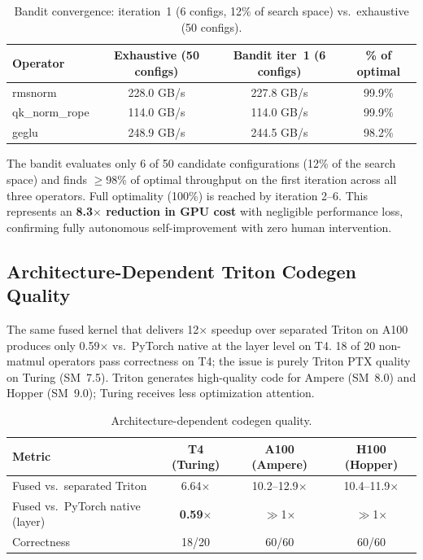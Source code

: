 \documentclass[11pt]{article}
\begin{document}
\begin{table}[t]
\centering
\caption{Bandit convergence: iteration~1 (6 configs, 12\% of search space) vs.\ exhaustive (50 configs).}
\label{tab:bandit-convergence}
\small
\begin{tabular}{@{}lccc@{}}
\toprule
Operator & Exhaustive (50 configs) & Bandit iter~1 (6 configs) & \% of optimal \\
\midrule
rmsnorm & 228.0 GB/s & 227.8 GB/s & 99.9\% \\
qk\_norm\_rope & 114.0 GB/s & 114.0 GB/s & 99.9\% \\
geglu & 248.9 GB/s & 244.5 GB/s & 98.2\% \\
\bottomrule
\end{tabular}
\end{table}

The bandit evaluates only 6 of 50 candidate configurations (12\% of the search
space) and finds $\geq$98\% of optimal throughput on the first iteration across
all three operators. Full optimality (100\%) is reached by iteration 2--6.
This represents an \textbf{8.3$\times$ reduction in GPU cost} with negligible
performance loss, confirming fully autonomous self-improvement with zero human
intervention.


\subsection{Architecture-Dependent Triton Codegen Quality}
\label{sec:codegen-quality}

The same fused kernel that delivers 12$\times$ speedup over separated Triton on
A100 produces only 0.59$\times$ vs.\ PyTorch native at the layer level on T4.
18 of 20 non-matmul operators pass correctness on T4; the issue is purely Triton
PTX quality on Turing (SM~7.5). Triton generates high-quality code for Ampere (SM~8.0) and
Hopper (SM~9.0); Turing receives less optimization attention.

\begin{table}[t]
\centering
\caption{Architecture-dependent codegen quality.}
\label{tab:codegen}
\small
\begin{tabular}{@{}lccc@{}}
\toprule
Metric & T4 (Turing) & A100 (Ampere) & H100 (Hopper) \\
\midrule
Fused vs.\ separated Triton & 6.64$\times$ & 10.2--12.9$\times$ & 10.4--11.9$\times$ \\
Fused vs.\ PyTorch native (layer) & \textbf{0.59$\times$} & $\gg$1$\times$ & $\gg$1$\times$ \\
Correctness & 18/20 & 60/60 & 60/60 \\
\bottomrule
\end{tabular}
\end{table}
\end{document}
